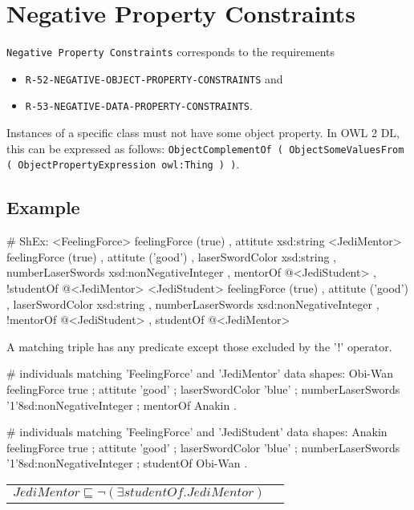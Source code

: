 \documentclass{llncs}
\newcommand{\ms}[1]{\texttt{#1}}
\newenvironment{DL}{
  \vspace{0cm}
	\begin{center}
  \begin{tabular}{r l}

}{
  \end{tabular}
	\end{center}
}
\begin{document}
\section{Negative Property Constraints}

\ms{Negative Property Constraints} corresponds to the requirements
\begin{itemize}
	\item \ms{R-52-NEGATIVE-OBJECT-PROPERTY-CONSTRAINTS} and
	\item \ms{R-53-NEGATIVE-DATA-PROPERTY-CONSTRAINTS}.
\end{itemize}
Instances of a specific class must not have some object property.
In OWL 2 DL, this can be expressed as follows: \ms{ObjectComplementOf ( ObjectSomeValuesFrom ( ObjectPropertyExpression owl:Thing ) )}.

\subsection{Example}

\begin{ex}
# ShEx:
<FeelingForce> {
    feelingForce (true) ,
    attitute xsd:string }
<JediMentor> {
    feelingForce (true) ,
    attitute ('good') ,
    laserSwordColor xsd:string ,
    numberLaserSwords xsd:nonNegativeInteger ,
    mentorOf @<JediStudent> ,
   !studentOf @<JediMentor> }
<JediStudent> {
    feelingForce (true) ,
    attitute ('good') ,
    laserSwordColor xsd:string ,
    numberLaserSwords xsd:nonNegativeInteger ,
   !mentorOf @<JediStudent> ,
    studentOf @<JediMentor> }
\end{ex}

A matching triple has any predicate except those excluded by the '!' operator.

\begin{ex}
# individuals matching 'FeelingForce' and 'JediMentor' data shapes:
Obi-Wan 
    feelingForce true ;
    attitute 'good' ;
    laserSwordColor 'blue' ;
    numberLaserSwords '1'^^xsd:nonNegativeInteger ;
    mentorOf Anakin .
\end{ex}

\begin{ex}
# individuals matching 'FeelingForce' and 'JediStudent' data shapes:
Anakin 
    feelingForce true ;
    attitute 'good' ;
    laserSwordColor 'blue' ;
    numberLaserSwords '1'^^xsd:nonNegativeInteger ;
    studentOf Obi-Wan .
\end{ex}

\begin{DL}
$JediMentor \sqsubseteq \neg(\exists studentOf.JediMentor)$
\end{DL}
\end{document}
